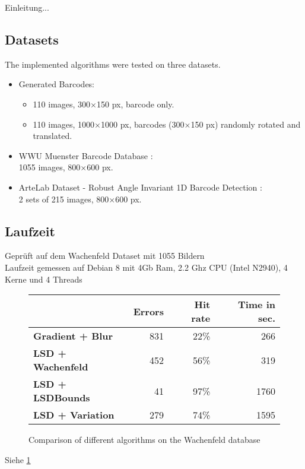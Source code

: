 Einleitung...
\subsection{Datasets}
The implemented algorithms were tested on three datasets.
\begin{itemize}
\item Generated Barcodes:
\begin{itemize}
\item 110 images, 300$\times$150 px, barcode only.
\item 110 images, 1000$\times$1000 px, barcodes (300$\times$150 px) randomly rotated and translated.
\end{itemize}
\item WWU Muenster Barcode Database \cite{MuensterBarcodeDB} \citep{wachenfeld2008robust}:\\
1055 images, 800$\times$600 px.
\item ArteLab Dataset - Robust Angle Invariant 1D Barcode Detection \cite{ArteLabDB} \cite{zamberletti2010neural} \citep{zamberletti2013robust}:\\
2 sets of 215 images, 800$\times$600 px.
\end{itemize}
\subsection{Laufzeit}
Geprüft auf dem Wachenfeld Dataset mit 1055 Bildern \cite{wachenfeld2008robust}\\
Laufzeit gemessen auf Debian 8 mit 4Gb Ram, 2.2 Ghz CPU (Intel N2940), 4 Kerne und 4 Threads

\begin{figure}[t]
\center
\bgroup
\def\arraystretch{1.5}
\begin{tabular}{|l|r|r|r|}
\hline
&\textbf{Errors}&\textbf{Hit rate}&\textbf{Time in sec.}\\
\hline
\textbf{Gradient + Blur}& 831& 22\%& 266\\
\hline
\textbf{LSD + Wachenfeld}& 452& 56\%& 319\\
\hline
\textbf{LSD + LSDBounds}& 41& 97\%& 1760\\
\hline
\textbf{LSD + Variation}& 279& 74\%& 1595\\
\hline
\end{tabular}
\egroup
\caption{Comparison of different algorithms on the Wachenfeld database \citep{MuensterBarcodeDB}}
\label{laufzeit}
\end{figure}
Siehe \cref{laufzeit}
 